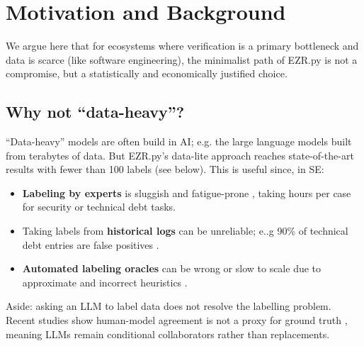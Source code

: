 
\section{ Motivation and Background}
We   argue here that  for ecosystems where verification is a primary bottleneck and data is scarce (like software engineering), the minimalist path of EZR.py is not a compromise, but a statistically and economically justified choice.


\subsection{Why not ``data-heavy''?} \label{dataheavy}
``Data-heavy'' models are often build in AI; e.g.
the large language models
built from terabytes of data.   But
EZR.py's data-lite approach reaches state-of-the-art results with
fewer than 100 labels (see below). This is
 useful since,  in SE: 
 \begin{itemize}
 \item
 {\bf  Labeling by experts} is sluggish and fatigue-prone \cite{easterby1980design}, taking hours per case for security or technical debt tasks.  
 \item Taking
 labels from {\bf historical logs} can be   unreliable; e..g   90\% of technical debt entries are false positives \cite{yu2020identifying}.  
 \item
{\bf Automated labeling oracles} can be wrong or slow to scale due to        approximate and   incorrect heuristics \cite{kamei2012large,DBLP:conf/wosp/ValovPGFC17}. 
 \end{itemize}
Aside: asking an LLM to label data does not resolve the labelling problem. Recent studies show human-model agreement is not a proxy for ground truth \cite{ahmed2024can}, meaning LLMs remain conditional collaborators rather than replacements.


